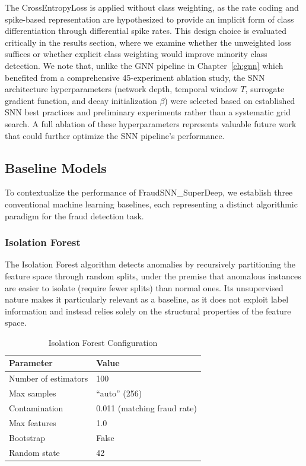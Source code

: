 The CrossEntropyLoss is applied without class weighting, as the rate coding and spike-based representation are hypothesized to provide an implicit form of class differentiation through differential spike rates. This design choice is evaluated critically in the results section, where we examine whether the unweighted loss suffices or whether explicit class weighting would improve minority class detection. We note that, unlike the GNN pipeline in Chapter~\ref{ch:gnn} which benefited from a comprehensive 45-experiment ablation study, the SNN architecture hyperparameters (network depth, temporal window $T$, surrogate gradient function, and decay initialization $\beta$) were selected based on established SNN best practices and preliminary experiments rather than a systematic grid search. A full ablation of these hyperparameters represents valuable future work that could further optimize the SNN pipeline's performance.

\subsection{Baseline Models}

To contextualize the performance of FraudSNN\_SuperDeep, we establish three conventional machine learning baselines, each representing a distinct algorithmic paradigm for the fraud detection task.

\subsubsection{Isolation Forest}

The Isolation Forest algorithm detects anomalies by recursively partitioning the feature space through random splits, under the premise that anomalous instances are easier to isolate (require fewer splits) than normal ones. Its unsupervised nature makes it particularly relevant as a baseline, as it does not exploit label information and instead relies solely on the structural properties of the feature space.

\begin{table}[H]
\centering
\caption{Isolation Forest Configuration}
\label{tab:snn-iforest-config}
\small
\begin{tabularx}{0.85\textwidth}{lX}
\toprule
\textbf{Parameter} & \textbf{Value} \\
\midrule
Number of estimators & 100 \\
Max samples & ``auto'' (256) \\
Contamination & 0.011 (matching fraud rate) \\
Max features & 1.0 \\
Bootstrap & False \\
Random state & 42 \\
\bottomrule
\end{tabularx}
\end{table}

